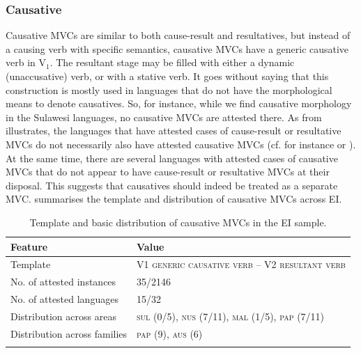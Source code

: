 \subsubsection{Causative}

Causative MVCs are similar to both cause-result and resultatives, but instead of a causing verb with specific semantics, causative MVCs have a generic causative verb in V$_1$. The resultant stage may be filled with either a dynamic (unaccusative) verb, or with a stative verb. It goes without saying that this construction is mostly used in languages that do not have the morphological means to denote causatives. So, for instance, while we find causative morphology in the Sulawesi languages, no causative MVCs are attested there. As  from  illustrates, the languages that have attested cases of cause-result or resultative MVCs do not necessarily also have attested causative MVCs (cf. for instance  or ). At the same time, there are several languages with attested cases of causative MVCs that do not appear to have cause-result or resultative MVCs at their disposal. This suggests that causatives should indeed be treated as a separate MVC.  summarises the template and distribution of causative MVCs across EI.

\begin{table}
\begin{tabular}{ll}
\lsptoprule
Feature&Value\tabularnewline
\midrule
Template&V1 \textsc{generic causative verb} -- V2 \textsc{resultant verb}\tabularnewline
No. of attested instances& 35/2146 \tabularnewline
No. of attested languages& 15/32 \tabularnewline
Distribution across areas& \textsc{sul} (0/5), \textsc{nus} (7/11), \textsc{mal} (1/5), \textsc{pap} (7/11) \tabularnewline
Distribution across families& \textsc{pap} (9), \textsc{aus} (6) \tabularnewline
\lspbottomrule
\end{tabular}
\caption[Template and basic distribution of causative MVCs]{Template and basic distribution of causative MVCs in the EI sample.}
\label{table:causative}
\end{table}

